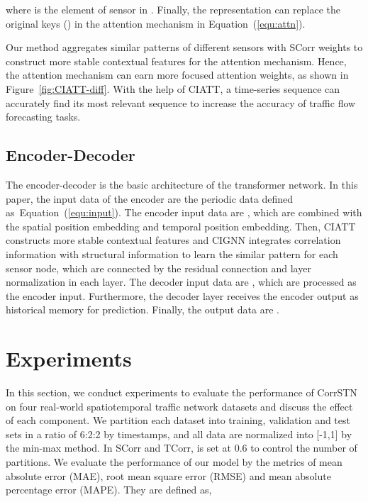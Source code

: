 \documentclass[sn-mathphys,iicol]{sn-jnl}
\newcommand\figref[1]{Figure~\ref{#1}}
\newcommand\equref[1]{Equation~(\ref{#1})}
\theoremstyle{thmstyleone}\newtheorem{theorem}{Theorem}\newtheorem{proposition}[theorem]{Proposition}
\theoremstyle{thmstyletwo}\newtheorem{example}{Example}\newtheorem{remark}{Remark}
\theoremstyle{thmstylethree}\newtheorem{definition}{Definition}
\begin{document}
where  is the element of sensor  in . Finally, the representation  can replace the original keys () in the attention mechanism in \equref{equ:attn}.

Our method aggregates similar patterns of different sensors with SCorr weights to construct more stable contextual features for the attention mechanism. Hence, the attention mechanism can earn more focused attention weights, as shown in \figref{fig:CIATT-diff}. With the help of CIATT, a time-series sequence can accurately find its most relevant sequence to increase the accuracy of traffic flow forecasting tasks.

\subsection{Encoder-Decoder}
The encoder-decoder is the basic architecture of the transformer network. In this paper, the input data of the encoder are the periodic data defined as~\equref{equ:input}. The encoder input data are , which are combined with the spatial position embedding and temporal position embedding. Then, CIATT constructs more stable contextual features and CIGNN integrates correlation information with structural information to learn the similar pattern for each sensor node, which are connected by the residual connection and layer normalization in each layer. The decoder input data are , which are processed as the encoder input. Furthermore, the decoder layer receives the encoder output as historical memory for prediction. Finally, the output data are .

\section{Experiments}
In this section, we conduct experiments to evaluate the performance of CorrSTN on four real-world spatiotemporal traffic network datasets and discuss the effect of each component. 
We partition each dataset into training, validation and test sets in a ratio of 6:2:2 by timestamps, and all data are normalized into [-1,1] by the min-max method. In SCorr and TCorr,  is set at 0.6 to control the number of partitions. We evaluate the performance of our model by the metrics of mean absolute error (MAE), root mean square error (RMSE) and mean absolute percentage error (MAPE). They are defined as,
\end{document}
